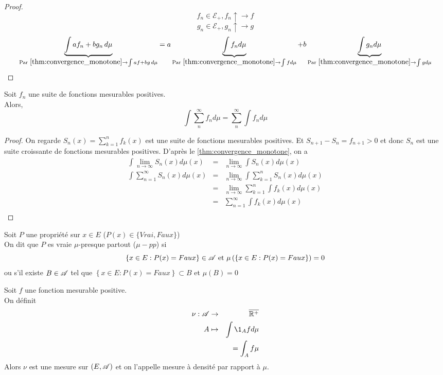 \begin{proof}
	$$f_n \in \mathcal{E}_+, f_n \uparrow \to f$$
	$$ g_n \in \mathcal{E}_+, g_n \uparrow \to g$$
	$$ \underbrace{\int a f_n + b g_n \,d\mu}_{\text{Par } \ref{thm:convergence_monotone} \to \int a f + b g\,d\mu}
		= a \underbrace{\int f_n d\mu}_{ \text{Par } \ref{thm:convergence_monotone} \to \int f d\mu}
		+ b \underbrace{\int g_n d\mu}_{ \text{Par } \ref{thm:convergence_monotone} \to \int g d\mu} $$
\end{proof}



\begin{prop} 
	Soit $f_n$ une suite de fonctions mesurables positives.\\
	Alors,
	$$ \int \sum\limits_n^{\infty} f_n d\mu = \sum\limits_n^{\infty} \int f_n d\mu $$
\end{prop}

\begin{proof}
	On regarde $S_n(x) = \sum\limits_{k=1}^n f_k(x)$ est une suite de fonctions mesurables positives.
	Et $S_{n+1} - S_n = f_{n+1} > 0 $ et donc $S_n$ est une suite croissante de fonctions mesurables positives.
	D'après le \ref{thm:convergence_monotone}, on a
	\begin{eqnarray*}
		\int \lim\limits_{n \to \infty} S_n (x)d\mu (x)&=& \lim\limits_{n \to \infty} \int S_n(x) d\mu(x) \\
		\int \sum\limits_{n = 1}^{\infty} S_n (x)d\mu (x)&=& \lim\limits_{n \to \infty} \int \sum\limits_{k = 1}^n S_n(x) d\mu(x) \\
		&=& \lim\limits_{n \to \infty} \sum\limits_{k = 1}^n\int  f_k(x) d\mu(x) \\
		&=& \sum\limits_{n = 1}^{\infty} \int  f_k(x) d\mu(x) \\
	\end{eqnarray*}
\end{proof}


\begin{definition}
	Soit $P$ une propriété sur $x \in E$ ($P(x) \in \{Vrai, Faux\}$)\\
	On dit que $P$ es vraie $\mu$-presque partout ($\mu-pp$) si
	$$ \left\{x \in E : P(x)  = Faux \right\} \in \mathscr{A} \text{ et } \mu\left(\left\{x \in E : P(x)  = Faux \right\}\right) = 0 $$
	ou s'il existe $B \in \mathscr{A}$ tel que $\left\{ x \in E : P(x) = Faux \right\} \subset B$ et $\mu(B) = 0$
\end{definition}

\begin{definition}
	Soit $f$ une fonction mesurable positive. \\
	On définit
	\begin{eqnarray*}
		\nu : \triA & \to &\Rbarp                  \\
		A     & \mapsto & \int \1_A f d\mu \\
		&& = \int_A f\mu
	\end{eqnarray*}
	Alors $\nu$ est une mesure sur $(E, \mathscr{A})$ et on l'appelle mesure à densité par rapport à $\mu$.
\end{definition}

